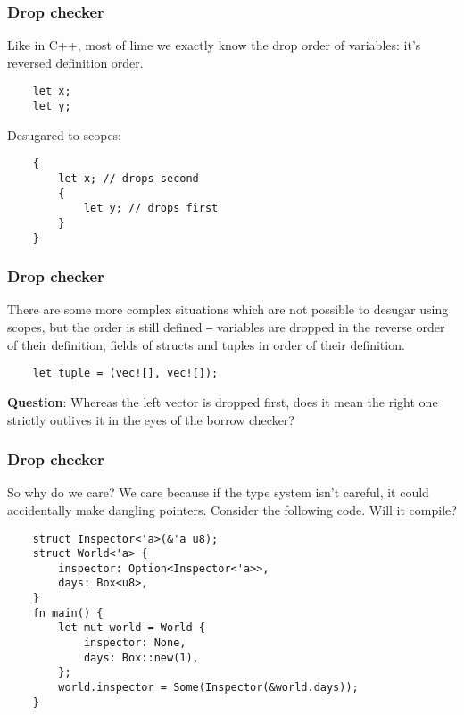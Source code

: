 \documentclass[aspectratio=1610,t]{beamer}
\begin{document}

\begin{frame}[fragile]
\frametitle{Drop checker}
Like in C++, most of lime we exactly know the drop order of variables: it's reversed definition order.

\begin{verbatim}
    let x;
    let y;
\end{verbatim}

Desugared to scopes:

\begin{verbatim}
    {
        let x; // drops second
        {
            let y; // drops first
        }
    }
\end{verbatim}
\end{frame}


\begin{frame}[fragile]
\frametitle{Drop checker}
There are some more complex situations which are not possible to desugar using scopes, but the order is still defined ‒ variables are dropped in the reverse order of their definition, fields of structs and tuples in order of their definition.

\begin{verbatim}
    let tuple = (vec![], vec![]);
\end{verbatim}

\textbf{Question}: Whereas the left vector is dropped first, does it mean the right one strictly outlives it in the eyes of the borrow checker? 
\end{frame}


\begin{frame}[fragile]
\frametitle{Drop checker}
So why do we care? We care because if the type system isn't careful, it could accidentally make dangling pointers. Consider the following code. Will it compile? 

\begin{verbatim}
    struct Inspector<'a>(&'a u8);
    struct World<'a> {
        inspector: Option<Inspector<'a>>,
        days: Box<u8>,
    }
    fn main() {
        let mut world = World {
            inspector: None,
            days: Box::new(1),
        };
        world.inspector = Some(Inspector(&world.days));
    }
\end{verbatim}
\end{frame}
\end{document}
